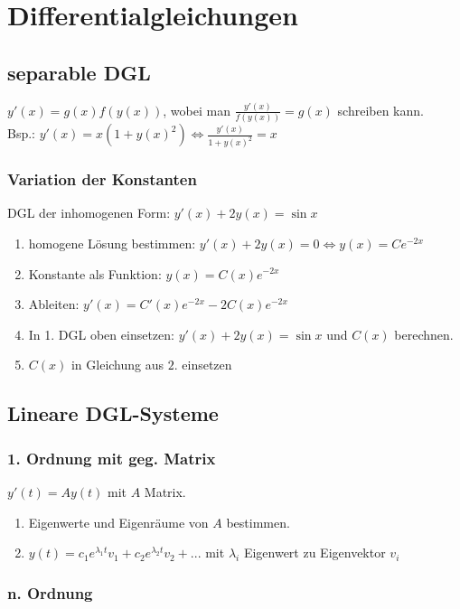 \documentclass[german, fourcolumn, 8pt]{latex4ei/latex4ei_sheet}
\begin{document}
\section{Differentialgleichungen}
\begin{sectionbox}
    \subsection{separable DGL}
    $y'(x)=g(x)f(y(x))$, wobei man $\frac{y'(x)}{f(y(x))}=g(x)$ schreiben kann. \\
    Bsp.: $y'(x)=x(1+y(x)^2) \Longleftrightarrow \frac{y'(x)}{1+y(x)^2}=x$
\end{sectionbox}

\begin{sectionbox}
    \subsubsection{Variation der Konstanten}
    DGL der inhomogenen Form: $y'(x)+2y(x)=\sin x$
    \begin{enumerate}
        \item homogene Lösung bestimmen: $y'(x)+2y(x)=0 \Leftrightarrow y(x)=Ce^{-2x}$
        \item Konstante als Funktion: $y(x)=C(x)e^{-2x}$
        \item Ableiten: $y'(x)=C'(x)e^{-2x}-2C(x)e^{-2x}$
        \item In 1. DGL oben einsetzen: $y'(x)+2y(x)=\sin x$ und $C(x)$ berechnen.
        \item $C(x)$ in Gleichung aus $2.$ einsetzen
    \end{enumerate}
\end{sectionbox}

\begin{sectionbox}
    \subsection{Lineare DGL-Systeme}
    \subsubsection{1. Ordnung mit geg. Matrix}
    $y'(t)=Ay(t)$ mit $A$ Matrix.
    \begin{enumerate}
        \item Eigenwerte und Eigenräume von $A$ bestimmen.
        \item $y(t)=c_1e^{\lambda_1t}v_1 + c_2e^{\lambda_2t}v_2 + ...$ mit $\lambda_i$ Eigenwert zu Eigenvektor $v_i$
    \end{enumerate}

    \subsubsection{n. Ordnung}
\end{sectionbox}
\end{document}
